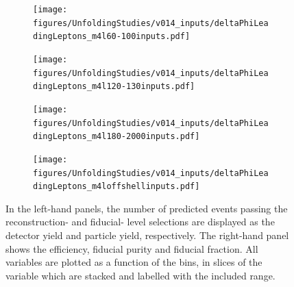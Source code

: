 \begin{figure}[htb]
    \centering 
    \begin{subfigure}{.99\textwidth}\centering
        \texttt{[image: figures/UnfoldingStudies/v014\_inputs/deltaPhiLeadingLeptons\_m4l60-100inputs.pdf]}
    \end{subfigure}
    \begin{subfigure}{.99\textwidth}\centering
        \texttt{[image: figures/UnfoldingStudies/v014\_inputs/deltaPhiLeadingLeptons\_m4l120-130inputs.pdf]}
    \end{subfigure}
    \begin{subfigure}{.99\textwidth}\centering
        \texttt{[image: figures/UnfoldingStudies/v014\_inputs/deltaPhiLeadingLeptons\_m4l180-2000inputs.pdf]}
    \end{subfigure}
    \begin{subfigure}{.99\textwidth}\centering
        \texttt{[image: figures/UnfoldingStudies/v014\_inputs/deltaPhiLeadingLeptons\_m4loffshellinputs.pdf]}
    \end{subfigure}
    \caption{In the left-hand panels, the number of predicted events passing the reconstruction- and fiducial- level selections are displayed as the detector yield and particle yield, respectively. The right-hand panel shows the efficiency, fiducial purity and fiducial fraction. All variables are plotted as a function of the \dPhill bins, in slices of the \mFourL variable which are stacked and labelled with the included \mFourL range.
    \label{fig:dphiunf}}
\end{figure}  

\FloatBarrier
\clearpage
